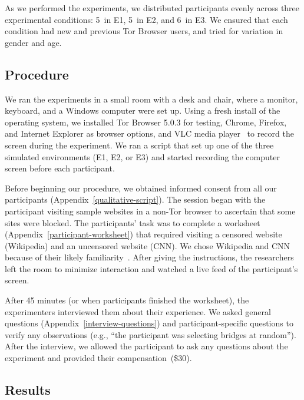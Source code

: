 \documentclass[USenglish,oneside,twocolumn]{article}
\begin{document}


As we performed the experiments, we distributed participants evenly across three experimental conditions:  5~in E1, 5~in E2, and 6~in E3. We ensured that each condition had new and previous Tor Browser users, and tried for variation in gender and age.

\subsection{Procedure} 
We ran the experiments in a small room with a desk and chair, where a monitor, keyboard, and a Windows computer were set up. Using a fresh install of the operating system, we installed Tor Browser 5.0.3 for testing, Chrome, Firefox, and Internet Explorer as browser options, and VLC media player~\cite{vlc} to record the screen during the experiment. We ran a script that set up one of the three simulated environments (E1, E2, or E3) and started recording the computer screen before each participant.

Before beginning our procedure, we obtained informed consent from all our participants (Appendix~\ref{qualitative-script}). The session began with the participant visiting sample websites in a non-Tor browser to ascertain that some sites were blocked. The participants' task was to complete a worksheet (Appendix~\ref{participant-worksheet}) that required visiting a censored website (Wikipedia) and an uncensored website (CNN). We chose Wikipedia and CNN because of their likely familiarity~\cite{alexa}. After giving the instructions, the researchers left the room to minimize interaction and watched a live feed of the participant's screen.

After 45 minutes (or when participants finished the worksheet), the experimenters interviewed them about their experience. We asked general questions (Appendix~\ref{interview-questions}) and participant-specific questions to verify any observations (e.g., ``the participant was selecting bridges at random''). After the interview, we allowed the participant to ask any questions about the experiment and provided their compensation~(\$30).

\subsection{Results} 

\label{sec:pain-points}
\end{document}
